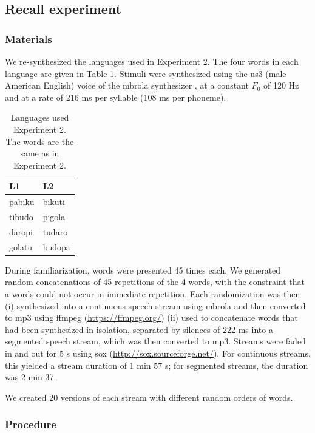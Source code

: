 \documentclass[
]{article}
\begin{document}
\subsection{Recall experiment}\label{recall-experiment}

\subsubsection{Materials}\label{materials}

We re-synthesized the languages used in \citet{Saffran-Science}
Experiment 2. The four words in each language are given in Table
\ref{tab:recall-languages}. Stimuli were synthesized using the us3 (male
American English) voice of the mbrola synthesizer \citep{mbrola}, at a
constant \(F_0\) of 120 Hz and at a rate of 216 ms per syllable (108 ms
per phoneme).

\begin{longtable}[t]{ll}
\caption{\label{tab:recall-print-languages}\label{tab:recall-languages}Languages used Experiment 2. The words are the same as in \cite{Saffran-Science} Experiment 2.}\\
\toprule
L1 & L2\\
\midrule
pabiku & bikuti\\
tibudo & pigola\\
daropi & tudaro\\
golatu & budopa\\
\bottomrule
\end{longtable}

During familiarization, words were presented 45 times each. We generated
random concatenations of 45 repetitions of the 4 words, with the
constraint that a words could not occur in immediate repetition. Each
randomization was then (i) synthesized into a continuous speech stream
using mbrola and then converted to mp3 using ffmpeg
(\url{https://ffmpeg.org/}) (ii) used to concatenate words that had been
synthesized in isolation, separated by silences of 222 ms into a
segmented speech stream, which was then converted to mp3. Streams were
faded in and out for 5 s using sox (\url{http://sox.sourceforge.net/}).
For continuous streams, this yielded a stream duration of 1 min 57 s;
for segmented streams, the duration was 2 min 37.

We created 20 versions of each stream with different random orders of
words.

\clearpage

\subsubsection{Procedure}\label{procedure-1}
\end{document}
